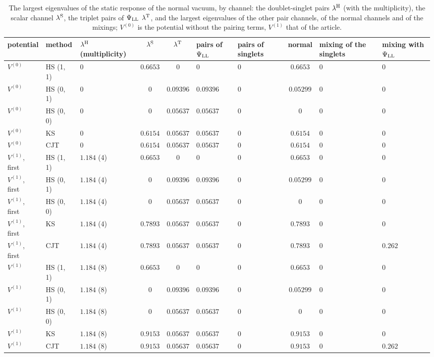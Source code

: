 \documentclass[aps,prd,onecolumn,superscriptaddress,nofootinbib,floatfix,longbibliography]{revtex4-2}
\newcommand{\LL}{{\rm LL}}
\begin{document}
\begin{table}[!htbp]
\caption{\label{tab:normal}The largest eigenvalues of the static response of the normal vacuum, by channel: the doublet-singlet pairs $\lambda^{\rm H}$ (with the multiplicity), the scalar channel $\lambda^{\rm S}$, the triplet pairs of $\Psi_\LL$ $\lambda^{\rm T}$, and the largest eigenvalues of the other pair channels, of the normal channels and of the mixings; $V^{(0)}$ is the potential without the pairing terms, $V^{(1)}$ that of the article.}
\begingroup\centering\scriptsize\setlength{\tabcolsep}{4pt}
\begin{tabular}{llp{}ccp{}p{}cp{}p{}}
\hline\hline
potential & method & $\lambda^{\rm H}$ (multiplicity) & $\lambda^{\rm S}$ & $\lambda^{\rm T}$ & pairs of $\Psi_{\rm LL}$ & pairs of singlets & normal & mixing of the singlets & mixing with $\Psi_{\rm LL}$ \\ \hline
$V^{(0)}$ & HS (1, 1) & $0$ & $0.6653$ & $0$ & $0$ & $0$ & $0.6653$ & $0$ & $0$ \\
$V^{(0)}$ & HS (0, 1) & $0$ & $0$ & $0.09396$ & $0.09396$ & $0$ & $0.05299$ & $0$ & $0$ \\
$V^{(0)}$ & HS (0, 0) & $0$ & $0$ & $0.05637$ & $0.05637$ & $0$ & $0$ & $0$ & $0$ \\
$V^{(0)}$ & KS & $0$ & $0.6154$ & $0.05637$ & $0.05637$ & $0$ & $0.6154$ & $0$ & $0$ \\
$V^{(0)}$ & CJT & $0$ & $0.6154$ & $0.05637$ & $0.05637$ & $0$ & $0.6154$ & $0$ & $0$ \\
$V^{(1)}$, first & HS (1, 1) & $1.184$ (4) & $0.6653$ & $0$ & $0$ & $0$ & $0.6653$ & $0$ & $0$ \\
$V^{(1)}$, first & HS (0, 1) & $1.184$ (4) & $0$ & $0.09396$ & $0.09396$ & $0$ & $0.05299$ & $0$ & $0$ \\
$V^{(1)}$, first & HS (0, 0) & $1.184$ (4) & $0$ & $0.05637$ & $0.05637$ & $0$ & $0$ & $0$ & $0$ \\
$V^{(1)}$, first & KS & $1.184$ (4) & $0.7893$ & $0.05637$ & $0.05637$ & $0$ & $0.7893$ & $0$ & $0$ \\
$V^{(1)}$, first & CJT & $1.184$ (4) & $0.7893$ & $0.05637$ & $0.05637$ & $0$ & $0.7893$ & $0$ & $0.262$ \\
$V^{(1)}$ & HS (1, 1) & $1.184$ (8) & $0.6653$ & $0$ & $0$ & $0$ & $0.6653$ & $0$ & $0$ \\
$V^{(1)}$ & HS (0, 1) & $1.184$ (8) & $0$ & $0.09396$ & $0.09396$ & $0$ & $0.05299$ & $0$ & $0$ \\
$V^{(1)}$ & HS (0, 0) & $1.184$ (8) & $0$ & $0.05637$ & $0.05637$ & $0$ & $0$ & $0$ & $0$ \\
$V^{(1)}$ & KS & $1.184$ (8) & $0.9153$ & $0.05637$ & $0.05637$ & $0$ & $0.9153$ & $0$ & $0$ \\
$V^{(1)}$ & CJT & $1.184$ (8) & $0.9153$ & $0.05637$ & $0.05637$ & $0$ & $0.9153$ & $0$ & $0.262$ \\
\hline\hline
\end{tabular}\par
\endgroup
\end{table}
\end{document}
